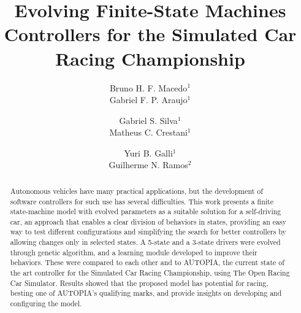 \documentclass[a4paper]{sbgames}
\title{Evolving Finite-State Machines Controllers for the Simulated Car Racing Championship}
\author{Bruno H. F. Macedo$^1$\\ Gabriel F. P. Araujo$^1$%
\and Gabriel S. Silva$^1$\\ Matheus C. Crestani$^1$%
\and Yuri B. Galli$^1$\\ Guilherme N. Ramos$^2$}%
\affiliation{$^1$Faculty of Technology, University of Bras\'{i}lia, Brazil%
\\$^2$Department of Computer Science, University of Bras\'{i}lia, Brazil}%
\begin{document}
	\maketitle

	\begin{abstract}
		Autonomous vehicles have many practical applications, but the development of software controllers for such use has several difficulties. This work presents a finite state-machine model with evolved parameters as a suitable solution for a self-driving car, an approach that enables a clear division of behaviors in states, providing an easy way to test different configurations and simplifying the search for better controllers by allowing changes only in selected states. A 5-state and a 3-state drivers were evolved through genetic algorithm, and a learning module developed to improve their behaviors. These were compared to each other and to AUTOPIA, the current state of the art controller for the Simulated Car Racing Championship, using The Open Racing Car Simulator. Results showed that the proposed model has potential for racing, besting one of AUTOPIA's qualifying marks, and provide insights on developing and configuring the model.
	\end{abstract}

	\keywordlist
	\contactlist

	\FloatBarrier%


	
	
\end{document}
